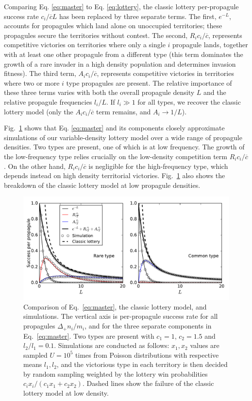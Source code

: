 \documentclass[12pt]{article}
\begin{document}
Comparing Eq. \eqref{eq:master} to Eq. \eqref{eq:lottery}, the classic lottery per-propagule success rate $c_i/\overline{c}L$ has been replaced by three separate terms. The first, $e^{-L}$, accounts for propagules which land alone on unoccupied territories; these propagules secure the territories without contest. The second, $R_i c_i/\overline{c}$, represents competitive victories on territories where only a single $i$ propagule lands, together with at least one other propagule from a different type (this term dominates the growth of a rare invader in a high density population and determines invasion fitness). The third term, $A_i c_i/\overline{c}$, represents competitive victories in territories where two or more $i$ type propagules are present. The relative importance of these three terms varies with both the overall propagule density $L$ and the relative propagule frequencies $l_i/L$. If $l_i\gg 1$ for all types, we recover the classic lottery model (only the $A_ic_i/\overline{c}$ term remains, and $A_i\rightarrow 1/L$). 

Fig.~\ref{fig:simcomp} shows that Eq. \eqref{eq:master} and its components closely approximate simulations of our variable-density lottery model over a wide range of propagule densities.  Two types are present, one of which is at low frequency. The growth of the low-frequency type relies crucially on the low-density competition term $R_i c_i/\overline{c}$. On the other hand, $R_i c_i/\overline{c}$ is negligible for the high-frequency type, which depends instead on high density territorial victories. Fig.~\ref{fig:simcomp} also shows the breakdown of the classic lottery model at low propagule densities.

\begin{figure}
\centering
\includegraphics[scale=0.8]{simulationcomparison.pdf}
\caption{\label{fig:simcomp} Comparison of Eq.~\eqref{eq:master}, the classic lottery model, and simulations. The vertical axis is per-propagule success rate for all propagules $\Delta_+ n_i/m_i$, and for the three separate components in Eq.~\eqref{eq:master}. Two types are present with $c_1=1$, $c_2=1.5$ and $l_2/l_1=0.1$. Simulations are conducted as follows: $x_1,x_2$ values are sampled $U=10^5$ times from Poisson distributions with respective means $l_1,l_2$, and the victorious type in each territory is then decided by random sampling weighted by the lottery win probabilities $c_ix_i/(c_1 x_1 + c_2 x_2)$. Dashed lines show the failure of the classic lottery model at low density.} 
\end{figure}
\end{document}
